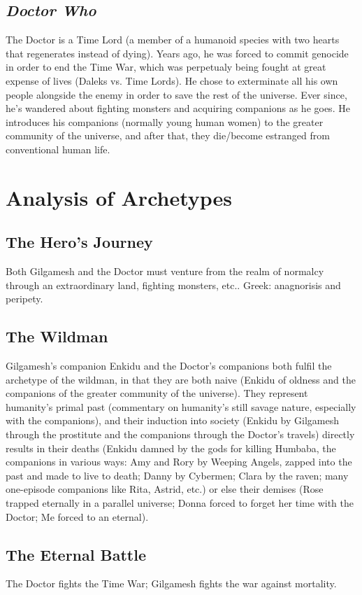 \documentclass[10pt,a4paper]{article}
\begin{document}
\subsection{\emph{Doctor Who}}
The Doctor is a Time Lord (a member of a humanoid species with two hearts that regenerates instead of dying). Years ago, he was forced to commit genocide in order to end the Time War, which was perpetualy being fought at great expense of lives (Daleks vs. Time Lords). He chose to exterminate all his own people alongside the enemy in order to save the rest of the universe. Ever since, he's wandered about fighting monsters and acquiring companions as he goes. He introduces his companions (normally young human women) to the greater community of the universe, and after that, they die/become estranged from conventional human life.


\section{Analysis of Archetypes}     
\subsection{The Hero's Journey}
Both Gilgamesh and the Doctor must venture from the realm of normalcy through an extraordinary land, fighting monsters, etc.. Greek: anagnorisis and peripety.

\subsection{The Wildman}
    Gilgamesh's companion Enkidu and the Doctor's companions both fulfil the archetype of the wildman, in that they are both naive (Enkidu of oldness and the companions of the greater community of the universe). They represent humanity's primal past (commentary on humanity's still savage nature, especially with the companions), and their induction into society (Enkidu by Gilgamesh through the prostitute and the companions through the Doctor's travels) directly results in their deaths (Enkidu damned by the gods for killing Humbaba, the companions in various ways: Amy and Rory by Weeping Angels, zapped into the past and made to live to death; Danny by Cybermen; Clara by the raven; many one-episode companions like Rita, Astrid, etc.) or else their demises (Rose trapped eternally in a parallel universe; Donna forced to forget her time with the Doctor; Me forced to an eternal).
    
\subsection{The Eternal Battle}
The Doctor fights the Time War; Gilgamesh fights the war against mortality.
\end{document}
